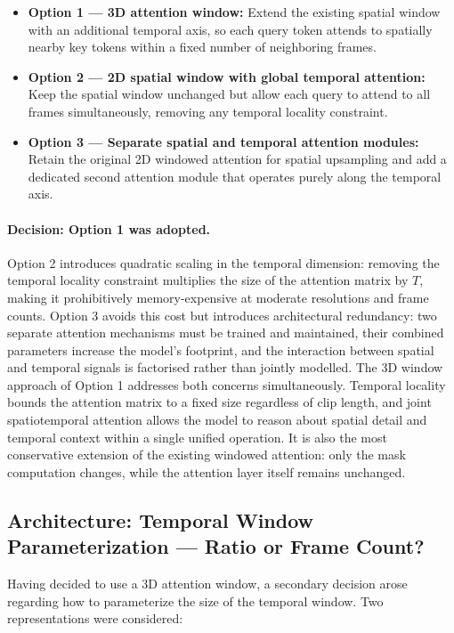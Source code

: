 \begin{itemize}
    \item \textbf{Option 1 --- 3D attention window:} Extend the existing spatial 
    window with an additional temporal axis, so each query token attends to 
    spatially nearby key tokens within a fixed number of neighboring frames.
    \item \textbf{Option 2 --- 2D spatial window with global temporal attention:} 
    Keep the spatial window unchanged but allow each query to attend to all 
    frames simultaneously, removing any temporal locality constraint.
    \item \textbf{Option 3 --- Separate spatial and temporal attention modules:} 
    Retain the original 2D windowed attention for spatial upsampling and add a 
    dedicated second attention module that operates purely along the temporal 
    axis.
\end{itemize}

\paragraph{Decision: Option 1 was adopted.}
Option 2 introduces quadratic scaling in the temporal dimension: removing the 
temporal locality constraint multiplies the size of the attention matrix by $T$, 
making it prohibitively memory-expensive at moderate resolutions and frame counts. 
Option 3 avoids this cost but introduces architectural redundancy: two separate 
attention mechanisms must be trained and maintained, their combined parameters 
increase the model's footprint, and the interaction between spatial and temporal 
signals is factorised rather than jointly modelled. The 3D window approach of 
Option 1 addresses both concerns simultaneously. Temporal locality bounds the 
attention matrix to a fixed size regardless of clip length, and joint 
spatiotemporal attention allows the model to reason about spatial detail and 
temporal context within a single unified operation. It is also the most 
conservative extension of the existing windowed attention: only the mask 
computation changes, while the attention layer itself remains unchanged.

\subsection{Architecture: Temporal Window Parameterization --- Ratio or Frame 
Count?}

Having decided to use a 3D attention window, a secondary decision arose regarding 
how to parameterize the size of the temporal window. Two representations were 
considered:

